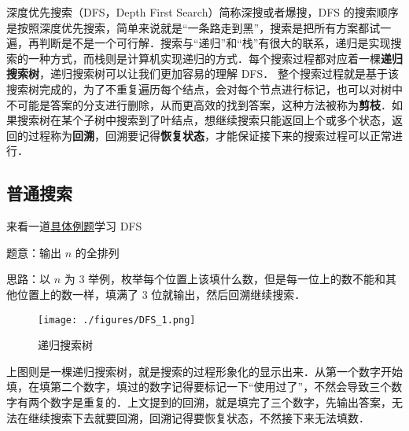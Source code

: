 
深度优先搜索（DFS，Depth First Search）简称深搜或者爆搜，DFS 的搜索顺序是按照深度优先搜索，简单来说就是“一条路走到黑”，搜索是把所有方案都试一遍，再判断是不是一个可行解．搜索与“递归”和“栈”有很大的联系，递归是实现搜索的一种方式，而栈则是计算机实现递归的方式．每个搜索过程都对应着一棵\textbf{递归搜索树}，递归搜索树可以让我们更加容易的理解 DFS．
整个搜索过程就是基于该搜索树完成的，为了不重复遍历每个结点，会对每个节点进行标记，也可以对树中不可能是答案的分支进行删除，从而更高效的找到答案，这种方法被称为\textbf{剪枝}．如果搜索树在某个子树中搜索到了叶结点，想继续搜索只能返回上个或多个状态，返回的过程称为\textbf{回溯}，回溯要记得\textbf{恢复状态}，才能保证接下来的搜索过程可以正常进行．


\subsection{普通搜索}
来看一道\href{https://www.luogu.com.cn/problem/P1706}{具体例题}学习 DFS

题意：输出 $n$ 的全排列

思路：以 $n$ 为 $3$ 举例，枚举每个位置上该填什么数，但是每一位上的数不能和其他位置上的数一样，填满了 $3$ 位就输出，然后回溯继续搜索．

\begin{figure}[ht]
\centering
\texttt{[image: ./figures/DFS\_1.png]}
\caption{递归搜索树} \label{DFS_fig1}
\end{figure}

上图则是一棵递归搜索树，就是搜索的过程形象化的显示出来．从第一个数字开始填，在填第二个数字，填过的数字记得要标记一下“使用过了”，不然会导致三个数字有两个数字是重复的．上文提到的回溯，就是填完了三个数字，先输出答案，无法在继续搜索下去就要回溯，回溯记得要恢复状态，不然接下来无法填数．

